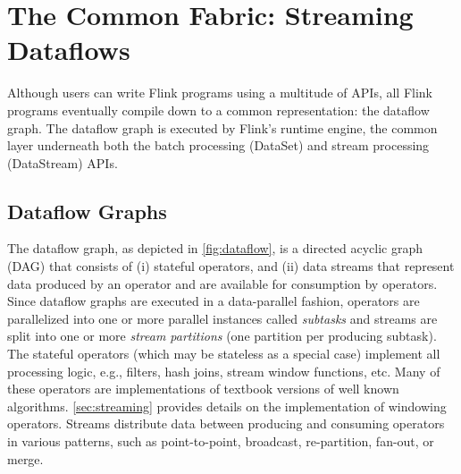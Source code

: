 
\section{The Common Fabric: Streaming Dataflows}
\label{sec:execution}

Although users can write Flink programs using a multitude of APIs, all Flink programs eventually compile down to a common representation: the dataflow graph. The dataflow graph is executed by Flink's runtime engine, the common layer underneath both the batch processing (DataSet) and stream processing (DataStream) APIs.

\subsection{Dataflow Graphs}
The dataflow graph, as depicted in \autoref{fig:dataflow}, is a directed acyclic graph (DAG) that consists of (i) stateful operators, and (ii) data streams that represent data produced by an operator and are available for consumption by operators. Since dataflow graphs are executed in a data-parallel fashion, operators are parallelized into one or more parallel instances called \emph{subtasks} and streams are split into one or more \emph{stream partitions} (one partition per producing subtask). 
The stateful operators (which may be stateless as a special case) implement all processing logic, e.g., filters, hash joins, stream window functions, etc. Many of these operators are implementations of textbook versions of well known algorithms. \autoref{sec:streaming} provides details on the implementation of windowing operators. Streams distribute data between producing and consuming operators in various patterns, such as point-to-point, broadcast, re-partition, fan-out, or merge.

